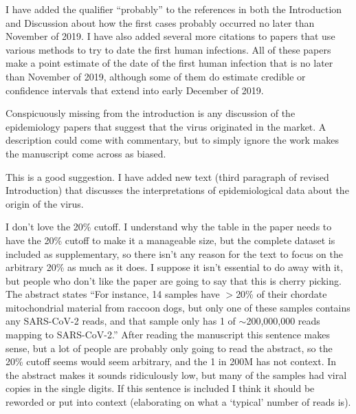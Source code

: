 \documentclass[11pt, oneside]{article}   	%
\newcommand{\response}[1]{{\color{black}#1}}
\begin{document}
\response{
I have added the qualifier ``probably'' to the references in both the Introduction and Discussion about how the first cases probably occurred no later than November of 2019.
I have also added several more citations to papers that use various methods to try to date the first human infections.
All of these papers make a point estimate of the date of the first human infection that is no later than November of 2019, although some of them do estimate credible or confidence intervals that extend into early December of 2019.
}

Conspicuously missing from the introduction is any discussion of the epidemiology papers that suggest that the virus originated in the market.  A description could come with commentary, but to simply ignore the work makes the manuscript come across as biased.

\response{
This is a good suggestion.
I have added new text (third paragraph of revised Introduction) that discusses the interpretations of epidemiological data about the origin of the virus.
}

I don’t love the 20\% cutoff.  I understand why the table in the paper needs to have the 20\% cutoff to make it a manageable size, but the complete dataset is included as supplementary, so there isn’t any reason for the text to focus on the arbitrary 20\% as much as it does.  I suppose it isn’t essential to do away with it, but people who don’t like the paper are going to say that this is cherry picking.
The abstract states ``For instance, 14 samples have $>$20\% of their chordate mitochondrial material from raccoon dogs, but only one of these samples contains any SARS-CoV-2 reads, and that sample only has 1 of $\sim$200,000,000 reads mapping to SARS-CoV-2.''  After reading the manuscript this sentence makes sense, but a lot of people are probably only going to read the abstract, so the 20\% cutoff seems would seem arbitrary, and the 1 in 200M has not context.  In the abstract makes it sounds ridiculously low, but many of the samples had viral copies in the single digits.  If this sentence is included I think it should be reworded or put into context (elaborating on what a `typical' number of reads is).
\end{document}
